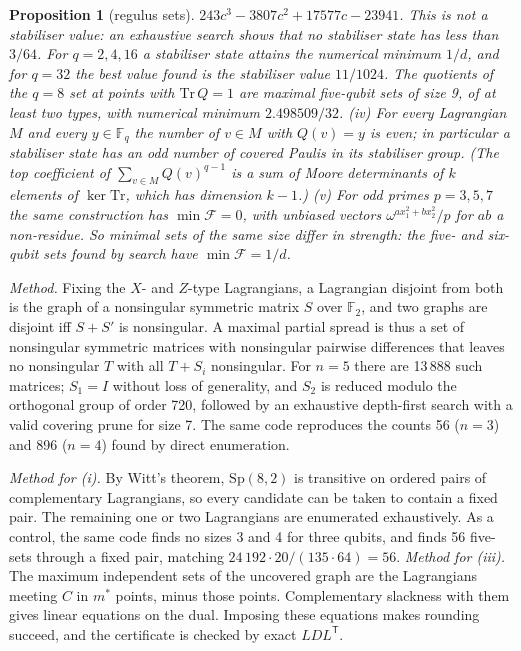 \documentclass[11pt]{article}
\newtheorem{proposition}[theorem]{Proposition}
\theoremstyle{remark}\newtheorem*{remark}{Remark}
\newcommand{\F}{\mathcal{F}}
\begin{document}
\begin{proposition}[regulus sets]
$243c^3-3807c^2+17577c-23941$. This is not a stabiliser value: an exhaustive
search shows that no stabiliser state has less than $3/64$. For $q=2,4,16$ a stabiliser state attains the numerical minimum $1/d$,
and for $q=32$ the best value found is the stabiliser value $11/1024$. The quotients of the $q=8$
set at points with $\mathrm{Tr}\,Q=1$ are maximal five-qubit sets of size 9, of at least two types, with numerical minimum
$2.498509/32$.
(iv) For every Lagrangian $M$ and every $y\in\mathbb{F}_q$ the number of $v\in M$ with $Q(v)=y$ is even; in particular a stabiliser
state has an odd number of covered Paulis in its stabiliser group. (The top coefficient of $\sum_{v\in M}Q(v)^{q-1}$ is a sum of Moore
determinants of $k$ elements of $\ker\mathrm{Tr}$, which has dimension $k-1$.)
(v) For odd primes $p=3,5,7$ the same construction has $\min\F=0$, with unbiased vectors $\omega^{ax_1^2+bx_2^2}/p$ for $ab$ a
non-residue. So minimal sets of the same size differ in strength: the five- and six-qubit sets found by search have $\min\F=1/d$.
\end{proposition}
\noindent\emph{Method.} Fixing the $X$- and $Z$-type Lagrangians, a Lagrangian disjoint from both is the graph of a nonsingular
symmetric matrix $S$ over $\mathbb{F}_2$, and two graphs are disjoint iff $S+S'$ is nonsingular. A maximal partial spread is thus a set
of nonsingular symmetric matrices with nonsingular pairwise differences that leaves no nonsingular $T$ with all $T+S_i$ nonsingular.
For $n=5$ there are 13\,888 such matrices; $S_1=I$ without loss of generality, and $S_2$ is reduced modulo the orthogonal group of
order 720, followed by an exhaustive depth-first search with a valid covering prune for size 7. The same code reproduces the counts 56 ($n=3$) and 896 ($n=4$) found by direct enumeration.

\noindent\emph{Method for (i).} By Witt's theorem, $\mathrm{Sp}(8,2)$ is transitive on ordered pairs of complementary Lagrangians, so
every candidate can be taken to contain a fixed pair. The remaining one or two Lagrangians are enumerated exhaustively. As a control,
the same code finds no sizes 3 and 4 for three qubits, and finds 56 five-sets through a fixed pair, matching
$24\,192\cdot20/(135\cdot64)=56$. \emph{Method for (iii).} The maximum independent sets of the uncovered graph are the Lagrangians
meeting $C$ in $m^*$ points, minus those points. Complementary slackness with them gives linear equations on the dual. Imposing these
equations makes rounding succeed, and the certificate is checked by exact $LDL^{\mathsf T}$.
\end{document}
